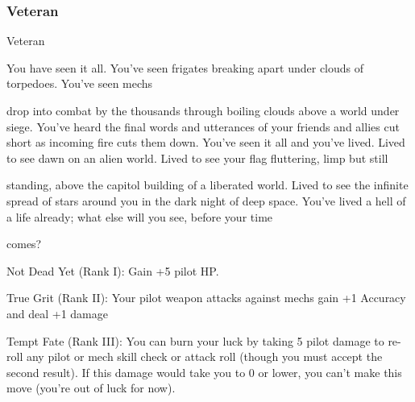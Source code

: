 \subsubsection{Veteran}

                                                     Veteran

You have seen it all. You’ve seen frigates breaking apart under clouds of torpedoes. You’ve seen mechs

drop into combat by the thousands through boiling clouds above a world under siege. You’ve heard the
final words and utterances of your friends and allies cut short as incoming fire cuts them down. You’ve seen
it all and you’ve lived. Lived to see dawn on an alien world. Lived to see your flag fluttering, limp but still

standing, above the capitol building of a liberated world. Lived to see the infinite spread of stars around you
in the dark night of deep space. You’ve lived a hell of a life already; what else will you see, before your time

comes?

Not Dead Yet (Rank I): Gain +5 pilot HP.





True Grit (Rank II): Your pilot weapon attacks against mechs gain +1 Accuracy and deal +1
damage

Tempt Fate (Rank III): You can burn your luck by taking 5 pilot damage to re-roll any pilot or
mech skill check or attack roll (though you must accept the second result). If this damage would
take you to 0 or lower, you can’t make this move (you’re out of luck for now).